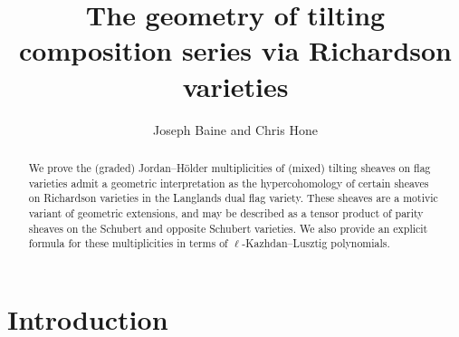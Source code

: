 \documentclass[11pt]{article}
\theoremstyle{remark}
\theoremstyle{definition}
\begin{document}
\title{The geometry of tilting composition series via Richardson varieties}
\author{Joseph Baine and Chris Hone}
\date{}


\newcommand{\Addresses}{{%
  \bigskip
  \footnotesize

  J.~Baine, \textsc{Max-Planck-Institut f\"{u}r Mathematik, Vivatsgasse 7, 53111 Bonn, Germany}\par\nopagebreak
  \textit{E-mail address}: \texttt{baine@mpim-bonn.mpg.de}

  \medskip

  C.~Hone, \textsc{Department of Mathematical Sciences, University of Copenhagen, Denmark}\par\nopagebreak
  \textit{E-mail address}: \texttt{cth@math.ku.dk}
}}



	
	\maketitle
	\begin{abstract}
		\noindent
		We prove the (graded) Jordan--H\"{o}lder multiplicities of (mixed) tilting sheaves on flag varieties admit a geometric interpretation as the hypercohomology of certain sheaves on Richardson varieties in the Langlands dual flag variety. These sheaves are a motivic variant of geometric extensions, and may be described as a tensor product of parity sheaves on the Schubert and opposite Schubert varieties. We also provide an explicit formula for these multiplicities in terms of $\ell$-Kazhdan--Lusztig polynomials.
	\end{abstract}
	
\section{Introduction}
\end{document}
